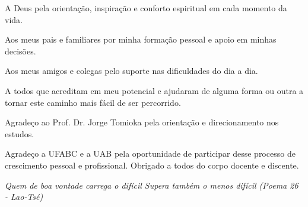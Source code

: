 \documentclass[
    12pt,               %
    openright,          %
    oneside,            %
    a4paper,            %
    chapter=TITLE,      %
    sumario=tradicional,
    english,            %
    french,             %
    spanish,            %
    brazil              %
]{abntex2}
\renewcommand{\imprimircapa}{
    \begin{capa}
        
    \end{capa}
}
\begin{document}
\frenchspacing %

\pretextual
\imprimircapa
\imprimirfolhaderosto



\begin{dedicatoria}
    \vspace*{\fill}

    A Deus pela orientação, inspiração e conforto espiritual em cada momento da
    vida.

    Aos meus pais e familiares por minha formação pessoal e apoio em minhas
    decisões.

    Aos meus amigos e colegas pelo suporte nas dificuldades do dia a dia.

    A todos que acreditam em meu potencial e ajudaram de alguma forma ou outra
    a tornar este caminho mais fácil de ser percorrido.

    \vspace*{\fill}
\end{dedicatoria}

\begin{agradecimentos}
    Agradeço ao Prof. Dr. Jorge Tomioka pela orientação e direcionamento nos
    estudos.

    Agradeço a UFABC e a UAB pela oportunidade de participar desse processo de
    crescimento pessoal e profissional. Obrigado a todos do corpo docente e
    discente.
\end{agradecimentos}

\begin{epigrafe}
    \vspace*{\fill}
    \begin{flushright}
        \textit{
            Quem de boa vontade carrega o difícil
            Supera também o menos difícil
            (Poema 26 - Lao-Tsé)
        }
    \end{flushright}
\end{epigrafe}



\listoffigures*
\cleardoublepage

\tableofcontents*
\cleardoublepage
\end{document}
